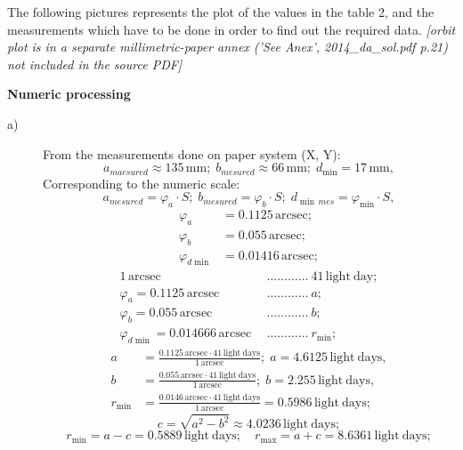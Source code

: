 The following pictures represents the plot of the values in the table 2, and
the measurements which have to be done in order to find out the required data.
\textit{[orbit plot is in a separate millimetric-paper annex ('See Anex', 2014\_da\_sol.pdf p.21) not included in the source PDF]}

\textbf{Numeric processing}

\begin{description}
\item[a)] From the measurements done on paper system (X, Y):
  \[
    a_{maesured} \approx 135\,\mathrm{mm};\;
    b_{mesured} \approx 66\,\mathrm{mm};\;
    d_{\min} = 17\,\mathrm{mm},
  \]
  Corresponding to the numeric scale:
  \[
    a_{mesured} = \varphi_a\cdot S;\;
    b_{mesured} = \varphi_b\cdot S;\;
    d_{\min\,mes} = \varphi_{\min}\cdot S,
  \]
  \begin{align*}
    \varphi_a &= 0.1125\,\mathrm{arcsec};\\
    \varphi_b &= 0.055\,\mathrm{arcsec};\\
    \varphi_{d\min} &= 0.01416\,\mathrm{arcsec};
  \end{align*}
  \begin{align*}
    1\,\mathrm{arcsec}\ &\ \dots\dots\dots\dots\ 41\,\mathrm{light\ day};\\
    \varphi_a = 0.1125\,\mathrm{arcsec}\ &\ \dots\dots\dots\dots\ a;\\
    \varphi_b = 0.055\,\mathrm{arcsec}\ &\ \dots\dots\dots\dots\ b;\\
    \varphi_{d\min} = 0.014666\,\mathrm{arcsec}\ &\ \dots\dots\dots\dots\ r_{\min};
  \end{align*}
  \begin{align*}
    a &= \frac{0.1125\,\mathrm{arcsec}\cdot41\,\mathrm{light\ days}}
              {1\,\mathrm{arcsec}};\;
    a = 4.6125\,\mathrm{light\ days},\\
    b &= \frac{0.055\,\mathrm{arcsec}\cdot41\,\mathrm{light\ days}}
              {1\,\mathrm{arcsec}};\;
    b = 2.255\,\mathrm{light\ days},\\
    r_{\min} &= \frac{0.0146\,\mathrm{arcsec}\cdot41\,\mathrm{light\ days}}
              {1\,\mathrm{arcsec}} = 0.5986\,\mathrm{light\ days};
  \end{align*}
  \[
    c = \sqrt{a^2 - b^2} \approx 4.0236\,\mathrm{light\ days};
  \]
  \[
    r_{\min} = a - c = 0.5889\,\mathrm{light\ days};\quad
    r_{\max} = a + c = 8.6361\,\mathrm{light\ days};
\]
\end{description}
